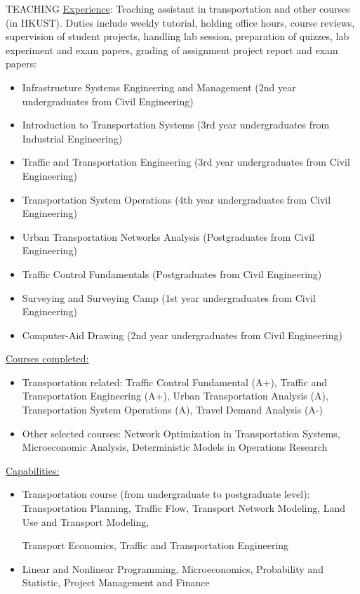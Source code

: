 \documentclass{resume} %
\begin{document}
\begin{rSection}{TEACHING}
\underline{Experience}: Teaching assistant in transportation and other courses (in HKUST).
Duties include weekly tutorial, holding office hours, course reviews, supervision of student
projects, handling lab session, preparation of quizzes, lab experiment and exam papers, grading
of assignment project report and exam papers:
\begin{itemize}
\itemsep -5pt
\item
Infrastructure Systems Engineering and Management (2nd year undergraduates from Civil
Engineering)
\item Introduction to Transportation Systems (3rd year undergraduates from Industrial
Engineering)
\item Traffic and Transportation Engineering (3rd year undergraduates from Civil
Engineering)
\item Transportation System Operations (4th year undergraduates from Civil
Engineering)
\item Urban Transportation Networks Analysis (Postgraduates from Civil Engineering)
\item Traffic Control Fundamentals (Postgraduates from Civil Engineering)
\item Surveying and Surveying Camp (1st year undergraduates from Civil Engineering)
\item Computer-Aid Drawing (2nd year undergraduates from Civil Engineering)
\end{itemize}
\underline{Courses completed:}
\begin{itemize}
\itemsep -5pt
\item Transportation related: Traffic Control Fundamental (A+), Traffic and
Transportation Engineering (A+), Urban Transportation Analysis (A), Transportation System
Operations (A), Travel Demand Analysis (A-)
\item Other selected courses: Network Optimization in Transportation Systems,
Microeconomic Analysis, Deterministic Models in Operations Research
\end{itemize}
\underline{Capabilities:}
\begin{itemize}
\itemsep -5pt
\item Transportation course (from undergraduate to postgraduate level): Transportation
Planning, Traffic Flow, Transport Network Modeling, Land Use and Transport Modeling,

Transport Economics, Traffic and Transportation Engineering
\item Linear and Nonlinear Programming, Microeconomics, Probability and Statistic,
Project Management and Finance
\end{itemize}
\end{rSection}
\end{document}
